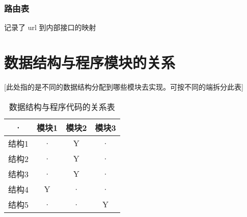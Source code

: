 \subsubsection{路由表}
记录了 url 到内部接口的映射



\section{数据结构与程序模块的关系}
[此处指的是不同的数据结构分配到哪些模块去实现。可按不同的端拆分此表]
\begin{table}[htbp]
\centering
\caption{数据结构与程序代码的关系表} \label{tab:datastructure-module}
\begin{tabular}{|c|c|c|c|}
    \hline
    · & 模块1 & 模块2 & 模块3 \\
    \hline
    结构1 & · & Y & · \\
    \hline
    结构2 & · & Y & · \\
    \hline
    结构3 & · & Y & · \\
    \hline
    结构4 & Y & · & · \\
    \hline
    结构5 & · & · & Y \\
    \hline
\end{tabular}
\end{table}